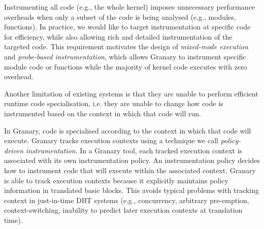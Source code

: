 \documentclass[preprint]{sigplanconf}
\begin{document}
Instrumenting all code (e.g., the whole kernel) imposes unnecessary performance overheads when only a subset of the code is being analysed (e.g., modules, functions). In practice, we would like to target instrumentation at specific code for efficiency, while also allowing rich and detailed instrumentation of the targeted code. This requirement motivates the design of \emph{mixed-mode execution} and \emph{probe-based instrumentation}, which allows Granary to instrument specific module code or functions while the majority of kernel code executes with zero overhead.


Another limitation of existing systems is that they are unable to perform efficient runtime code specialisation, i.e. they are unable to change how code is instrumented based on the context in which that code will run. 


In Granary, code is specialised according to the context in which that code will execute. Granary tracks execution contexts using a technique we call \emph{policy-driven instrumentation}. In a Granary tool, each tracked execution context is associated with its own instrumentation policy. An instrumentation policy decides how to instrument code that will execute within the associated context. Granary is able to track execution contexts because it explicitly maintains policy information in translated basic blocks. This avoids typical problems with tracking context in just-in-time DBT systems (e.g., concurrency, arbitrary pre-emption, context-switch\-ing, inability to predict later execution contexts at translation time).
\end{document}
